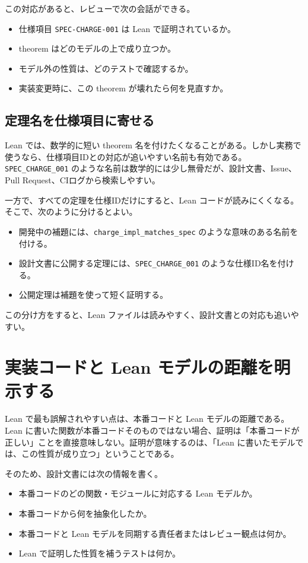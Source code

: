 この対応があると、レビューで次の会話ができる。

\begin{itemize}
\item 仕様項目 \texttt{SPEC-CHARGE-001} は Lean で証明されているか。
\item theorem はどのモデルの上で成り立つか。
\item モデル外の性質は、どのテストで確認するか。
\item 実装変更時に、この theorem が壊れたら何を見直すか。
\end{itemize}

\subsection{定理名を仕様項目に寄せる}

Lean では、数学的に短い theorem 名を付けたくなることがある。しかし実務で使うなら、仕様項目IDとの対応が追いやすい名前も有効である。\texttt{SPEC\_CHARGE\_001} のような名前は数学的には少し無骨だが、設計文書、Issue、Pull Request、CIログから検索しやすい。

一方で、すべての定理を仕様IDだけにすると、Lean コードが読みにくくなる。そこで、次のように分けるとよい。

\begin{itemize}
\item 開発中の補題には、\texttt{charge\_impl\_matches\_spec} のような意味のある名前を付ける。
\item 設計文書に公開する定理には、\texttt{SPEC\_CHARGE\_001} のような仕様ID名を付ける。
\item 公開定理は補題を使って短く証明する。
\end{itemize}

この分け方をすると、Lean ファイルは読みやすく、設計文書との対応も追いやすい。

\section{実装コードと Lean モデルの距離を明示する}

Lean で最も誤解されやすい点は、本番コードと Lean モデルの距離である。Lean に書いた関数が本番コードそのものではない場合、証明は「本番コードが正しい」ことを直接意味しない。証明が意味するのは、「Lean に書いたモデルでは、この性質が成り立つ」ということである。

そのため、設計文書には次の情報を書く。

\begin{itemize}
\item 本番コードのどの関数・モジュールに対応する Lean モデルか。
\item 本番コードから何を抽象化したか。
\item 本番コードと Lean モデルを同期する責任者またはレビュー観点は何か。
\item Lean で証明した性質を補うテストは何か。
\end{itemize}

